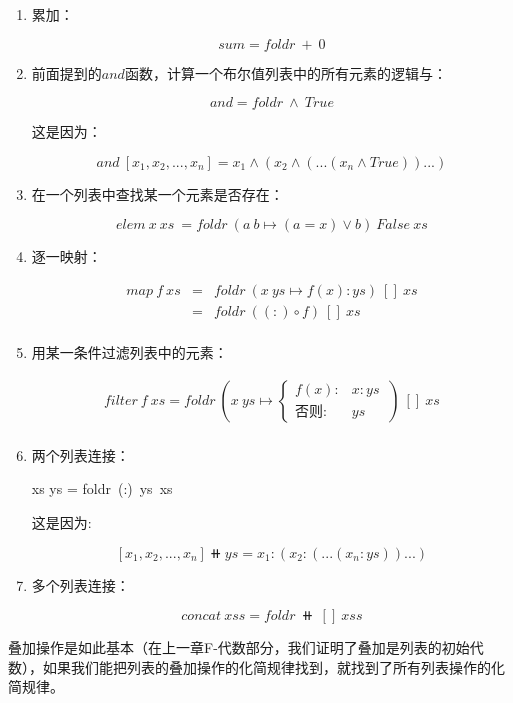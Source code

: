 \documentclass{article}
\begin{document}
\begin{enumerate}
\item 累加：

\[
sum = foldr\ +\ 0
\]

\item 前面提到的$and$函数，计算一个布尔值列表中的所有元素的逻辑与：

\[
and = foldr\ \land\ True
\]

这是因为：

\[
and\ [x_1, x_2, ..., x_n] = x_1 \land (x_2 \land (...(x_n \land True))...)
\]

\item 在一个列表中查找某一个元素是否存在：

\[
elem\ x\ xs\ = foldr\ (a\ b \mapsto (a = x) \lor b)\ False\ xs
\]

\item 逐一映射：

\[
\begin{array}{rcl}
map\ f\ xs & = & foldr\ (x\ ys \mapsto f(x) : ys)\ []\ xs \\
           & = & foldr\ ((:) \circ f)\ []\ xs \\
\end{array}
\]

\item 用某一条件过滤列表中的元素：

\[
\begin{array}{rl}
filter\ f\ xs = foldr\ (x\ ys \mapsto
  \begin{cases}
    f(x): & x:ys\ \\
    \text{否则}: & ys
  \end{cases})\ []\ xs \\
\end{array}
\]

\item 两个列表连接：

\be
xs \doubleplus ys = foldr\ (:)\ ys\ xs
\label{eq:binary-concat}
\ee

这是因为:

\[
[x_1, x_2, ..., x_n] \doubleplus ys = x_1 : (x_2 : (...(x_n : ys))...)
\]

\item 多个列表连接：

\[
concat\ xss = foldr\ \doubleplus\ []\ xss
\]

\end{enumerate}

叠加操作是如此基本（在上一章F-代数部分，我们证明了叠加是列表的初始代数），如果我们能把列表的叠加操作的化简规律找到，就找到了所有列表操作的化简规律。
\end{document}
